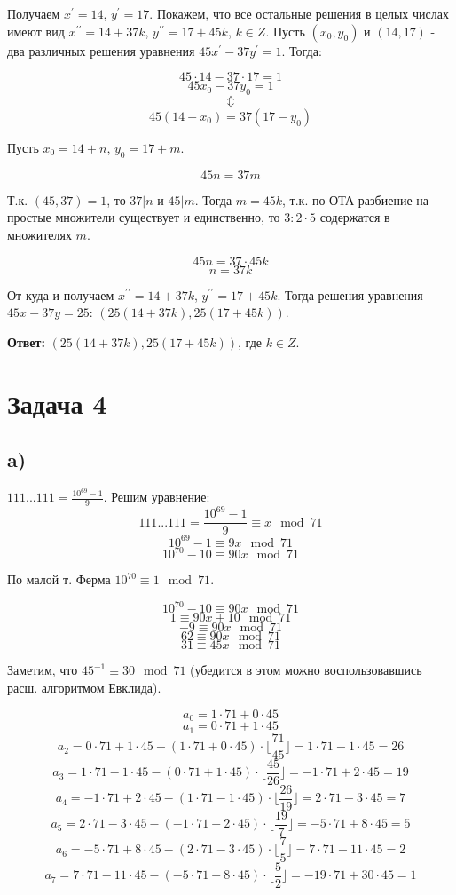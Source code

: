 \documentclass{article}
\begin{document}
		Получаем $x^\prime = 14$, $y^\prime = 17$. Покажем, что все остальные решения в целых числах имеют вид $x^{\prime\prime} = 14 + 37k$, $y^{\prime\prime} = 17 + 45k$, $k \in Z$.
		Пусть $(x_0, y_0)$ и $(14, 17)$ - два различных решения уравнения $45x^\prime - 37y^\prime = 1$. Тогда:
		
		$$ 45\cdot 14 - 37\cdot 17 = 1$$ 
		$$ 45x_0 - 37y_0 = 1$$
		$$ \Updownarrow $$
		$$ 45 (14 - x_0) = 37 (17 - y_0) $$
		
		Пусть $x_0 = 14 + n$, $y_0 = 17 + m$.
		
		$$ 45 n = 37 m $$
		
		Т.к. $ (45, 37) = 1$, то $37 | n$ и $45 | m$. Тогда $m = 45k$, т.к. по ОТА разбиение на простые множители существует и единственно, то $3:2 \cdot 5$ содержатся в множителях $m$.
		
		$$ 45 n = 37 \cdot 45k$$
		$$ n = 37k$$
		
		От куда и получаем $x^{\prime\prime} = 14 + 37k$, $y^{\prime\prime} = 17 + 45k$.
		Тогда решения уравнения $45x - 37y = 25$: $(25(14 + 37k), 25(17 + 45k))$.
		
		\textbf{Ответ:} $(25(14 + 37k), 25(17 + 45k))$, где $k \in Z$.	
		
		\section {Задача 4}
		
		\subsection {a)} $111...111 = \frac{10^{69} - 1}{9}$. Решим уравнение:
		$$111...111 = \frac{10^{69} - 1}{9} \equiv x \mod 71$$ 
				$$10^{69} - 1 \equiv 9x \mod 71$$
				$$10^{70} - 10 \equiv 90x \mod 71$$
		
		По малой т. Ферма $10^{70} \equiv 1 \mod 71$.
		
				$$10^{70} - 10 \equiv 90x \mod 71$$
				$$1 \equiv 90x + 10 \mod 71$$
				$$-9 \equiv 90x \mod 71$$
				$$62 \equiv 90x \mod 71$$
				$$31 \equiv 45x \mod 71$$
				
		Заметим, что $ 45^{-1} \equiv 30 \mod 71$ (убедится в этом можно воспользовавшись расш. алгоритмом Евклида).
		
		$$ a_0 = 1 \cdot 71 + 0 \cdot 45 $$ 
		$$ a_1 = 0 \cdot 71 + 1 \cdot 45 $$ 
		$$ a_2 = 0 \cdot 71 + 1 \cdot 45 - (1 \cdot 71 + 0 \cdot 45) \cdot \lfloor\frac{71} {45}\rfloor = 1 \cdot 71 - 1 \cdot 45 = 26 $$
		$$ a_3 = 1 \cdot 71 - 1 \cdot 45 - (0 \cdot 71 + 1 \cdot 45) \cdot \lfloor\frac{45} {26}\rfloor = -1 \cdot 71 + 2 \cdot 45 = 19 $$
		$$ a_4 = -1 \cdot 71 + 2 \cdot 45 - (1 \cdot 71 - 1 \cdot 45) \cdot \lfloor\frac{26} {19}\rfloor = 2 \cdot 71 - 3 \cdot 45 = 7 $$
		$$ a_5 = 2 \cdot 71 - 3 \cdot 45 - (-1 \cdot 71 + 2 \cdot 45) \cdot \lfloor\frac{19} {7}\rfloor = -5 \cdot 71 + 8 \cdot 45 = 5 $$
		$$ a_6 = -5 \cdot 71 + 8 \cdot 45 - (2 \cdot 71 - 3 \cdot 45) \cdot \lfloor\frac{7} {5}\rfloor = 7 \cdot 71 - 11 \cdot 45 = 2 $$
		$$ a_7 = 7 \cdot 71 - 11 \cdot 45 - (-5 \cdot 71 + 8 \cdot 45) \cdot \lfloor\frac{5} {2}\rfloor = -19 \cdot 71 + 30 \cdot 45 = 1 $$
		
\end{document}
